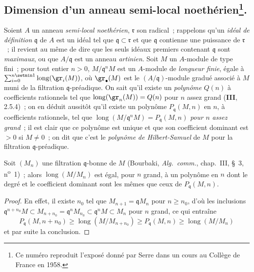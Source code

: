 \subsection[Dimension d'un anneau semi-local noethérien]{Dimension d'un
anneau semi-local noethérien\protect\footnote{Ce numéro reproduit l'exposé
donné par Serre dans un cours au Collège de France en 1958.}.}
\label{subsection:0.16.2-fr}

\begin{env}[16.2.1]
\label{0.16.2.1-fr}
Soient $A$ un anneau \emph{semi-local noethérien}, $\mathfrak{r}$ son radical~;
rappelons qu'un \emph{idéal de définition} $\mathfrak{q}$ de $A$ est un idéal tel que
$\mathfrak{q}\subset\mathfrak{r}$ et que $\mathfrak{q}$ contienne une
puissance de $\mathfrak{r}$~; il revient au même de dire que les seuls idéaux
premiers contenant $\mathfrak{q}$ sont \emph{maximaux}, ou que $A/\mathfrak{q}$ est
un anneau \emph{artinien}. Soit $M$ un $A$-module de type fini~; pour tout entier
$n>0$, $M/\mathfrak{q}^nM$ est un $A$-module de \emph{longueur finie}, égale à
$\sum_{i=0}^{n\setmin 1}\operatorname{long}(\gr_i(M))$, où $\gr_\bullet(M)$ est le
$(A/\mathfrak{q})$-module gradué associé à $M$ muni de la filtration
$\mathfrak{q}$-préadique. On sait qu'il existe un \emph{polynôme} $Q(n)$ à
coefficients rationnels tel que $\operatorname{long}(\gr_n(M))=Q(n)$ pour $n$
assez grand (\textbf{III}, 2.5.4)~; on en déduit aussitôt qu'il existe un polynôme
$P_{\mathfrak{q}}(M,n)$ en $n$, à coefficients rationnels, tel que
$\operatorname{long}(M/\mathfrak{q}^nM)=P_{\mathfrak{q}}(M,n)$
\emph{pour $n$ assez grand}~; il est clair que ce polynôme est unique et que son
coefficient dominant est $>0$ si $M\neq0$~; on dit que c'est le \emph{polynôme de
Hilbert-Samuel} de $M$ pour la filtration $\mathfrak{q}$-préadique.
\end{env}

\begin{lemma}[16.2.2.1]
\label{0.16.2.2.1-fr}
Soit $(M_n)$ une filtration $\mathfrak{q}$-bonne de $M$ \textup{(Bourbaki,
\emph{Alg.~comm.}, chap.~III, \S~3, n\textsuperscript{o}~1)}~; alors
$\operatorname{long}(M/M_n)$ est égal, pour $n$ grand, à un polynôme en $n$
dont le degré et le coefficient dominant sont les mêmes que ceux de
$P_{\mathfrak{q}}(M,n)$.
\end{lemma}

\begin{proof}
En effet, il existe $n_0$ tel que $M_{n+1}=\mathfrak{q}M_n$ pour $n\geq n_0$,
d'où les inclusions
$\mathfrak{q}^{n+n_0}M\subset M_{n+n_0}=\mathfrak{q}^nM_{n_0}
\subset\mathfrak{q}^nM\subset M_n$ pour $n$ grand, ce qui entraîne
\[
  P_{\mathfrak{q}}(M,n+n_0)\geq
  \operatorname{long}(M/M_{n+n_0})\geq
  P_{\mathfrak{q}}(M,n)\geq\operatorname{long}(M/M_n)
\]
et par suite la conclusion.
\end{proof}

